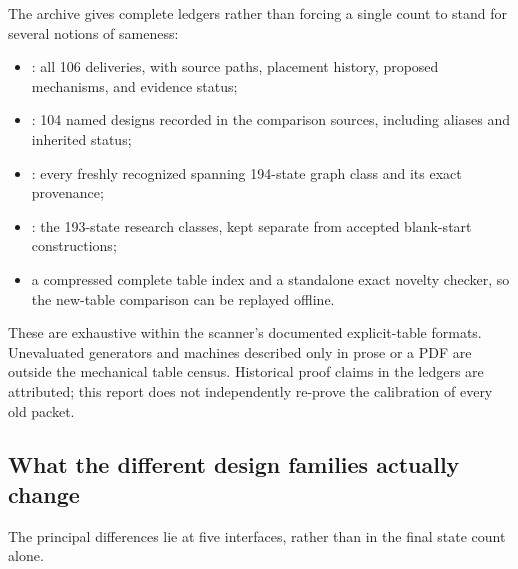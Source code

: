 \documentclass[11pt,a4paper]{article}
\begin{document}
The archive gives complete ledgers rather than forcing a single count to
stand for several notions of sameness:
\begin{itemize}
\item {}: all 106 deliveries, with source
paths, placement history, proposed mechanisms, and evidence status;
\item {}: 104 named designs recorded
in the comparison sources, including aliases and inherited status;
\item {}: every freshly recognized spanning
194-state graph class and its exact provenance;
\item {}: the 193-state research
classes, kept separate from accepted blank-start constructions;
\item a compressed complete table index and a standalone exact novelty
checker, so the new-table comparison can be replayed offline.
\end{itemize}
These are exhaustive within the scanner's documented explicit-table
formats. Unevaluated generators and machines described only in prose or a
PDF are outside the mechanical table census. Historical proof claims in
the ledgers are attributed; this report does not independently re-prove
the calibration of every old packet.

\subsection{What the different design families actually change}
The principal differences lie at five interfaces, rather than in the final
state count alone.
\end{document}
